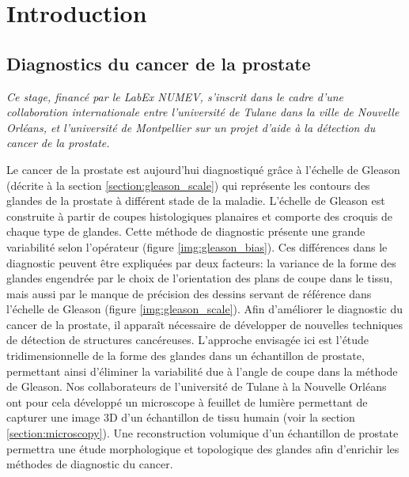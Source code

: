 \chapter{Introduction}\label{chapter:01:introduction}
{
    \section{Diagnostics du cancer de la prostate}\label{section:contexte} %
    {
        \emph{Ce stage, financé par le LabEx NUMEV, s'inscrit dans le cadre d'une collaboration internationale entre l'université de Tulane dans la ville de Nouvelle Orléans, et l'université de Montpellier sur un projet d'aide à la détection du cancer de la prostate.}\medskip

        Le cancer de la prostate est aujourd'hui diagnostiqué grâce à l'échelle de Gleason (décrite à la section \ref{section:gleason_scale}) qui représente les contours des glandes de la prostate à différent stade de la maladie. L'échelle de Gleason est construite à partir de coupes histologiques planaires et comporte des croquis de chaque type de glandes. Cette méthode de diagnostic présente une grande variabilité selon l'opérateur (figure \ref{img:gleason_bias}). Ces différences dans le diagnostic peuvent être expliquées par deux facteurs: la variance de la forme des glandes engendrée par le choix de l'orientation des plans de coupe dans le tissu, mais aussi par le manque de précision des dessins servant de référence dans l'échelle de Gleason (figure \ref{img:gleason_scale}). Afin d'améliorer le diagnostic du cancer de la prostate, il apparaît nécessaire de développer de nouvelles techniques de détection de structures cancéreuses. L'approche envisagée ici est l'étude tridimensionnelle de la forme des glandes dans un échantillon de prostate, permettant ainsi d'éliminer la variabilité due à l'angle de coupe dans la méthode de Gleason. Nos collaborateurs de l'université de Tulane à la Nouvelle Orléans ont pour cela développé un microscope à feuillet de lumière permettant de capturer une image 3D d'un échantillon de tissu humain (voir la section \ref{section:microscopy}). Une reconstruction volumique d'un échantillon de prostate permettra une étude morphologique et topologique des glandes afin d'enrichir les méthodes de diagnostic du cancer.

}}
